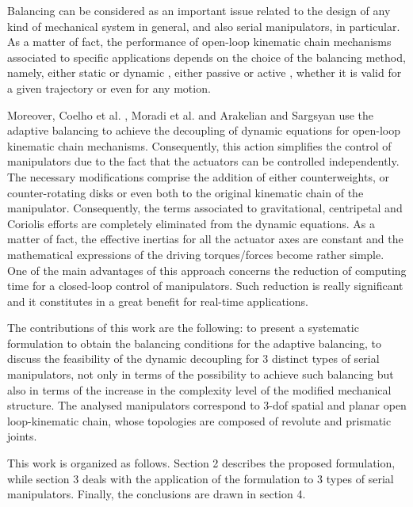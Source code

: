 \documentclass[a4paper,11pt,brazil,fleqn]{article}
\begin{document}
Balancing can be considered as an important issue related to the design of any kind of mechanical system in general, and also serial manipulators, in particular. As a matter of fact, the performance of open-loop kinematic chain mechanisms associated to specific applications depends on the choice of the balancing method, namely, either static \cite{6wang} or dynamic \cite{4wu}, either passive \cite{1wijk,4wu,5gosselin,6wang,7wang,8alici,9alici,10dehkordi,12russo,13agrawal} or active \cite{2arakelian,3seo,11wang,14briot,15coelho,16moradi}, whether it is valid for a given trajectory or even for any motion.

Moreover, Coelho et al. \cite{15coelho}, Moradi et al. \cite{16moradi} and Arakelian and Sargsyan \cite{17arakelian} use the adaptive balancing to achieve the decoupling of dynamic equations for open-loop kinematic chain mechanisms. Consequently, this action simplifies the control of manipulators due to the fact that the actuators can be controlled independently. The necessary modifications comprise the addition of either counterweights, or counter-rotating disks or even both to the original kinematic chain of the manipulator. Consequently, the terms associated to gravitational, centripetal and Coriolis efforts are completely eliminated from the dynamic equations. As a matter of fact, the effective inertias for all the actuator axes are constant and the mathematical expressions of the driving torques/forces become rather simple. One of the main advantages of this approach concerns the reduction of computing time for a closed-loop control of manipulators. Such reduction is really significant and it constitutes in a great benefit for real-time applications.

The contributions of this work are the following: to present a systematic formulation to obtain the balancing conditions for the adaptive balancing, to discuss the feasibility of the dynamic decoupling for 3 distinct types of serial manipulators, not only in terms of the possibility to achieve such balancing but also in terms of the increase in the complexity level of the modified mechanical structure. The analysed manipulators correspond to 3-dof spatial and planar open loop-kinematic chain, whose topologies are composed of revolute and prismatic joints. 

This work is organized as follows. Section 2 describes the proposed formulation, while section 3 deals with the application of the formulation to 3 types of serial manipulators. Finally, the conclusions are drawn in section 4.
\end{document}
